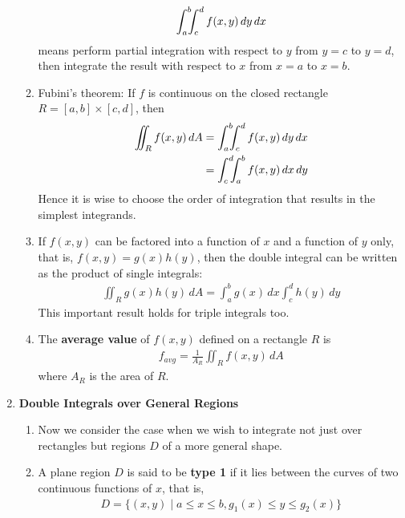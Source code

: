 \documentclass[10pt]{article}
\begin{document}
\begin{multicols}{2}
\begin{enumerate}
\begin{enumerate}
        \begin{align*}
            \int_a^b \hspace{-1.8mm}\int_c^d f(x,y) \,dy \,dx 
        \end{align*}
        means perform partial integration with respect to $y$ from $y=c$ to $y=d$, then integrate the result with respect to $x$ from $x=a$ to $x=b$.
        \item Fubini's theorem: If $f$ is continuous on the closed rectangle $R= [a,b] \times [c,d]$, then
        \begin{align*}
            \iint_R f(x,y) \,dA &= \int_a^b \hspace{-1.8mm} \int_c^d f(x,y) \,dy \,dx \\ &= \int_c^d \hspace{-1.8mm} \int_a^b f(x,y) \,dx \,dy
        \end{align*}
        Hence it is wise to choose the order of integration that results in the simplest integrands.
        \item If $f(x,y)$ can be factored into a function of $x$ and a function of $y$ only, that is, $f(x,y) = g(x)h(y)$, then the double integral can be written as the product of single integrals:
        \begin{align*}
            \iint_R g(x)h(y) \,dA = \int_a^b g(x) \,dx \int_c^d h(y) \,dy
        \end{align*}
        This important result holds for triple integrals too.
        \item The \textbf{average value} of $f(x,y)$ defined on a rectangle $R$ is 
        \begin{align*}
            f_{avg} = \frac{1}{A_R} \iint_R f(x,y) \,dA
        \end{align*}
        where $A_R$ is the area of $R$.
    \end{enumerate}
    \item \textbf{Double Integrals over General Regions}
    \begin{enumerate} 
        \item Now we consider the case when we wish to integrate not just over rectangles but regions $D$ of a more general shape. 
        \item A plane region $D$ is said to be \textbf{type 1} if it lies between the curves of two continuous functions of $x$, that is,
        \begin{align*}
            D = \{(x,y) \mid a \leq x \leq b, g_1(x) \leq y \leq g_2(x) \}
        \end{align*}

\end{enumerate}
\end{enumerate}
\end{multicols}
\end{document}
